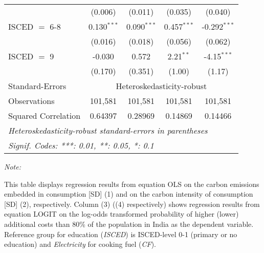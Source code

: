 \begin{table}[htbp!]
\begin{adjustbox}{width = 1\textwidth, max height = 0.95\textheight, center}
\begin{threeparttable}[b]
\begin{tabular}{lcccc}
                                 & (0.006)            & (0.011)            & (0.035)        & (0.040)\\   
            ISCED $=$ 6-8        & 0.130$^{***}$      & 0.090$^{***}$      & 0.457$^{***}$  & -0.292$^{***}$\\   
                                 & (0.016)            & (0.018)            & (0.056)        & (0.062)\\   
            ISCED $=$ 9          & -0.030             & 0.572              & 2.21$^{**}$    & -4.15$^{***}$\\   
                                 & (0.170)            & (0.351)            & (1.00)         & (1.17)\\   
            \midrule 
            Standard-Errors & \multicolumn{4}{c}{Heteroskedasticity-robust} \\ 
            Observations         & 101,581            & 101,581            & 101,581        & 101,581\\  
            Squared Correlation  & 0.64397            & 0.28969            & 0.14869        & 0.14466\\  
            \midrule \midrule
            \multicolumn{5}{l}{\emph{Heteroskedasticity-robust standard-errors in parentheses}}\\
            \multicolumn{5}{l}{\emph{Signif. Codes: ***: 0.01, **: 0.05, *: 0.1}}\\
         \end{tabular}
         
         \begin{tablenotes}\item \medskip \textit{Note:}
            \item This table displays regression results from equation OLS on the carbon emissions embedded in consumption [SD] (1) and on the carbon intensity of consumption [SD] (2), respectively. 
                                      Column (3) ((4) respectively) shows regression results from equation LOGIT on the log-odds transformed probability of higher (lower) additional costs than 80\% of the population in India as the dependent variable. Reference group for education (\textit{ISCED}) is ISCED-level 0-1 (primary or no education) and \textit{Electricity} for cooking fuel (\textit{CF}).
         \end{tablenotes}
      \end{threeparttable}
   \end{adjustbox}
\end{table}


